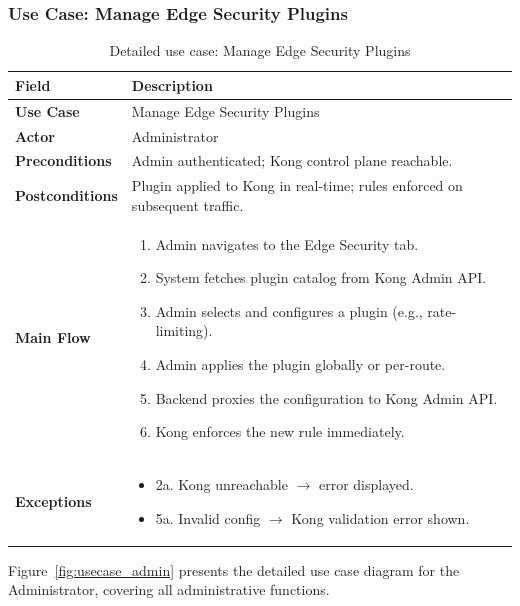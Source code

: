\subsubsection{Use Case: Manage Edge Security Plugins}

\begin{table}[H]
\centering
\renewcommand{\arraystretch}{1.5}
\begin{tabularx}{\textwidth}{| >{\bfseries}l | >{\raggedright\arraybackslash}X |}
\hline
\rowcolor{rowgray}
Field & \textbf{Description} \\
\hline
Use Case & Manage Edge Security Plugins \\
\hline
Actor & Administrator \\
\hline
Preconditions & Admin authenticated; Kong control plane reachable. \\
\hline
Postconditions & Plugin applied to Kong in real-time; rules enforced on subsequent traffic. \\
\hline
Main Flow &
\begin{enumerate}[nosep, leftmargin=0.5cm, topsep=2pt]
    \item Admin navigates to the Edge Security tab.
    \item System fetches plugin catalog from Kong Admin API.
    \item Admin selects and configures a plugin (e.g., rate-limiting).
    \item Admin applies the plugin globally or per-route.
    \item Backend proxies the configuration to Kong Admin API.
    \item Kong enforces the new rule immediately.
\end{enumerate} \\
\hline
Exceptions &
\begin{itemize}[nosep, leftmargin=0.5cm]
    \item 2a. Kong unreachable $\rightarrow$ error displayed.
    \item 5a. Invalid config $\rightarrow$ Kong validation error shown.
\end{itemize} \\
\hline
\end{tabularx}
\caption{Detailed use case: Manage Edge Security Plugins}
\label{tab:uc_plugins}
\end{table}

Figure~\ref{fig:usecase_admin} presents the detailed use case diagram for the Administrator, covering all administrative functions.

